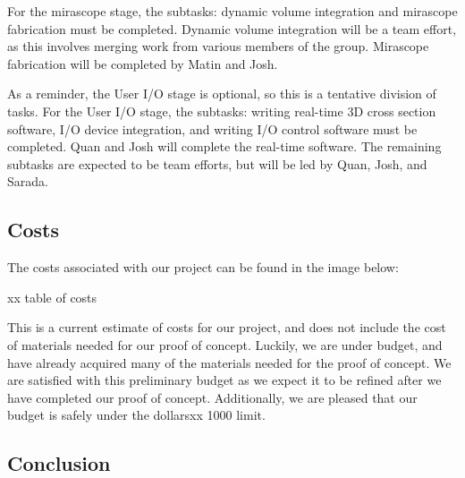 \documentclass[12pt]{article}
\begin{document}
For the mirascope stage, the subtasks: dynamic volume integration and mirascope fabrication must be completed. Dynamic volume integration will be a team effort, as this involves merging work from various members of the group. Mirascope fabrication will be completed by Matin and Josh. 

As a reminder, the User I/O stage is optional, so this is a tentative division of tasks. For the User I/O stage, the subtasks: writing real-time 3D cross section software, I/O device integration, and writing I/O control software must be completed. Quan and Josh will complete the real-time software. The remaining subtasks are expected to be team efforts, but will be led by Quan, Josh, and Sarada.

\subsection{Costs}
The costs associated with our project can be found in the image below:

xx table of costs

This is a current estimate of costs for our project, and does not include the cost of materials needed for our proof of concept. Luckily, we are under budget, and have already acquired many of the materials needed for the proof of concept. We are satisfied with this preliminary budget as we expect it to be refined after we have completed our proof of concept. Additionally, we are pleased that our budget is safely under the dollarsxx 1000 limit. 

\subsection{Conclusion}
\end{document}
